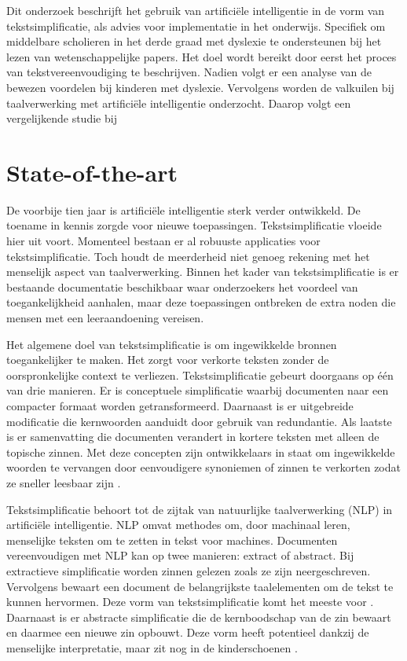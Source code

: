 Dit onderzoek beschrijft het gebruik van artificiële intelligentie in de vorm van tekstsimplificatie, als advies voor implementatie in het onderwijs. Specifiek om middelbare scholieren in het derde graad met dyslexie te ondersteunen bij het lezen van wetenschappelijke papers. Het doel wordt bereikt door eerst het proces van tekstvereenvoudiging te beschrijven. Nadien volgt er een analyse van de bewezen voordelen bij kinderen met dyslexie. Vervolgens worden de valkuilen bij taalverwerking met artificiële intelligentie onderzocht. Daarop volgt een vergelijkende studie bij 


\section{State-of-the-art}%
\label{sec:state-of-the-art}

De voorbije tien jaar is artificiële intelligentie sterk verder ontwikkeld. De toename in kennis zorgde voor nieuwe toepassingen. Tekstsimplificatie vloeide hier uit voort. Momenteel bestaan er al robuuste applicaties voor tekstsimplificatie. Toch houdt de meerderheid niet genoeg rekening met het menselijk aspect van taalverwerking. Binnen het kader van tekstsimplificatie is er bestaande documentatie beschikbaar waar onderzoekers het voordeel van toegankelijkheid aanhalen, maar deze toepassingen ontbreken de extra noden die mensen met een leeraandoening vereisen.

Het algemene doel van tekstsimplificatie is om ingewikkelde bronnen toegankelijker te maken. Het zorgt voor verkorte teksten zonder de oorspronkelijke context te verliezen. Tekstsimplificatie gebeurt doorgaans op één van drie manieren. Er is conceptuele simplificatie waarbij documenten naar een compacter formaat worden getransformeerd. Daarnaast is er uitgebreide modificatie die kernwoorden aanduidt door gebruik van redundantie. Als laatste is er samenvatting die documenten verandert in kortere teksten met alleen de topische zinnen. Met deze concepten zijn ontwikkelaars in staat om ingewikkelde woorden te vervangen door eenvoudigere synoniemen of zinnen te verkorten zodat ze sneller leesbaar zijn \autocite{Siddharthan2014}.

Tekstsimplificatie behoort tot de zijtak van natuurlijke taalverwerking (NLP) in artificiële intelligentie. NLP omvat methodes om, door machinaal leren, menselijke teksten om te zetten in tekst voor machines. Documenten vereenvoudigen met NLP kan op twee manieren: extract of abstract. Bij extractieve simplificatie worden zinnen gelezen zoals ze zijn neergeschreven. Vervolgens bewaart een document de belangrijkste taalelementen om de tekst te kunnen hervormen. Deze vorm van tekstsimplificatie komt het meeste voor \autocite{Sciforce2020}. Daarnaast is er abstracte simplificatie die de kernboodschap van de zin bewaart en daarmee een nieuwe zin opbouwt. Deze vorm heeft potentieel dankzij de menselijke interpretatie, maar zit nog in de kinderschoenen \autocite{Chowdhary2020}.

